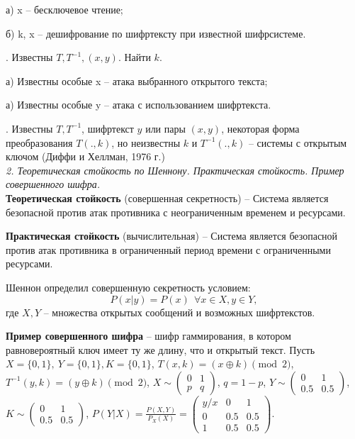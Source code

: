 а) x -- бесключевое чтение;

б) k, x -- дешифрование по шифртексту при известной шифрсистеме.

. Известны $T, T^{-1}, (x, y)$. Найти $k$.

а) Известны особые x -- атака выбранного открытого текста;

а) Известны особые y -- атака с использованием шифртекста.

. Известны $T, T^{-1}$, шифртекст $y$ или пары $(x, y)$, некоторая форма преобразования $T(.,k)$, но неизвестны $k$ и $T^{-1}(., k)$ -- системы с открытым ключом (Диффи и Хеллман, 1976 г.) \\

\noindent \textit{2. Теоретическая стойкость по Шеннону. Практическая стойкость. Пример совершенного шифра.} \\

\textbf{Теоретическая стойкость} (совершенная секретность) -- Система является безопасной против атак противника с неограниченным временем и ресурсами.

\textbf{Практическая стойкость} (вычислительная) -- Система является безопасной против атак противника в ограниченный период времени с ограниченными ресурсами.

Шеннон определил совершенную секретность условием:
$$P(x | y) = P(x)\ \ \forall x \in X, y \in Y,$$
\noindent где $X, Y$ -- множества открытых сообщений и возможных шифртекстов.

\textbf{Пример совершенного шифра} -- шифр гаммирования, в котором равновероятный ключ имеет ту же длину, что и открытый текст. Пусть $X = \{0, 1\},\ Y = \{0, 1\}, K = \{0, 1\}$, $T(x, k) = (x \oplus k) \pmod 2$, \\ $T^{-1}(y, k) = (y \oplus k) \pmod 2$, $X \sim \begin{pmatrix}
    0 & 1 \\
    p & q
  \end{pmatrix}$, $q = 1 - p$, $Y \sim \begin{pmatrix}
    0 & 1 \\
    0.5 & 0.5
  \end{pmatrix}$, $K \sim \begin{pmatrix}
    0 & 1 \\
    0.5 & 0.5
  \end{pmatrix}$, $P(Y|X) = \frac{P(X, Y)}{P_X (X)} = \begin{pmatrix}
    y/x & 0 & 1 \\
    0 & 0.5 & 0.5 \\
    1 & 0.5 & 0.5 
  \end{pmatrix}$.

